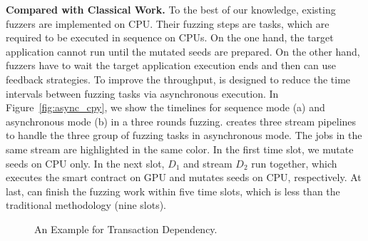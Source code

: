 \noindent\textbf{Compared with Classical Work.}
To the best of our knowledge, existing fuzzers are implemented on CPU. 
Their fuzzing steps are tasks, which are required to be executed in sequence on CPUs.
On the one hand, the target application cannot run until the mutated seeds are prepared. 
On the other hand, fuzzers have to wait the target application execution ends and then can use feedback strategies. 
%
To improve the throughput, {\tool} is designed to reduce the time intervals between fuzzing tasks via asynchronous execution.
%
In Figure~\ref{fig:async_cpy}, we show the timelines for sequence mode (a) and asynchronous mode (b) in a three rounds fuzzing. 
{\tool} creates three stream pipelines to handle the three group of fuzzing tasks in asynchronous mode. 
The jobs in the same stream are highlighted in the same color. 
In the first time slot, we mutate seeds on CPU only. In the next slot, $D_1$ and stream $D_2$ run together, which executes the smart contract on GPU and mutates seeds on CPU, respectively. 
%
At last, {\tool} can finish the fuzzing work within five time slots, which is less than the traditional methodology (nine slots).
%



\begin{figure}[ht]
    \centering
    
    \vspace{-0.1in}
    \caption{An Example for Transaction Dependency.}
    \label{fig:code_tx_dep}
\end{figure}

